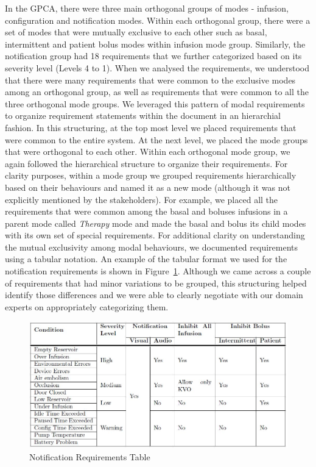 In the GPCA, there were three main orthogonal groups of modes - infusion, configuration and notification modes. Within each orthogonal group, there were a set of modes that were mutually exclusive to each other such as basal, intermittent and patient bolus modes within infusion mode group. Similarly, the notification group had 18 requirements that we further categorized based on its severity level (Levels 4 to 1). When we analysed the requirements, we understood that there were many requirements that were common to the exclusive modes among an orthogonal group, as well as requirements that were common to all the three orthogonal mode groups. We leveraged this pattern of modal requirements to organize requirement statements within the document in an hierarchial fashion. In this structuring, at the top most level we placed requirements that were common to the entire system. At the next level, we placed the mode groups that were orthogonal to each other. Within each orthogonal mode group, we again followed the hierarchical structure to organize their requirements. For clarity purposes, within a mode group we grouped requirements hierarchically based on their behaviours and named it as a new mode (although it was not explicitly mentioned by the stakeholders). For example, we placed all the requirements that were common among the basal and boluses infusions in a parent mode called \emph{Therapy} mode and made the basal and bolus its child modes with its own set of special requirements. For additional clarity on understanding the mutual exclusivity among modal behaviours, we documented requirements using a tabular notation. An example of the tabular format we used for the notification requirements is shown in Figure~\ref{fig:gpca-alarm}. Although we came across a couple of requirements that had minor variations to be grouped, this structuring helped identify those differences and we were able to clearly negotiate with our domain experts on appropriately categorizing them. 

 \begin{figure}[h!]
    \centering
    \includegraphics[width=\columnwidth]{images/alarm.jpg}
    \caption{Notification Requirements Table}
    \label{fig:gpca-alarm}
 \end{figure}


